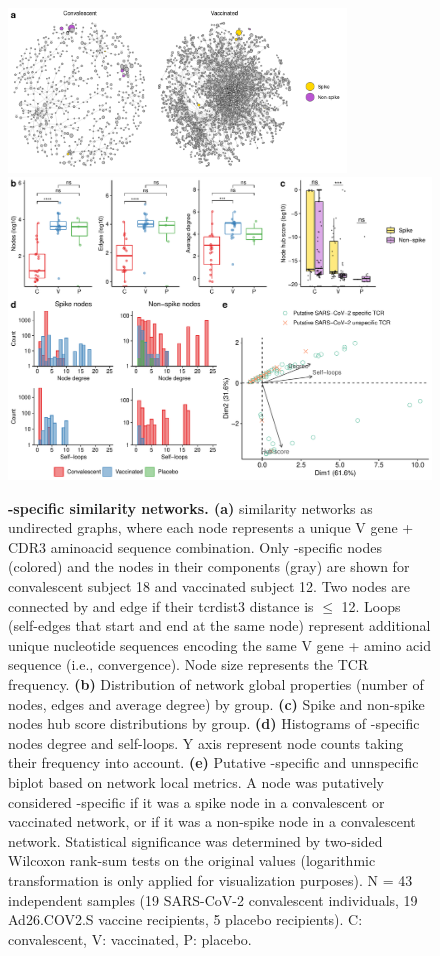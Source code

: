 \begin{figure}[!t]
	\centering
	\includegraphics[width=0.8\textwidth,keepaspectratio]{figures/two_nets.png}
	\includegraphics[width=\textwidth,keepaspectratio]{figures/fig4.pdf}
	\caption{\textbf{\covid-specific \TCRB{} similarity networks. (a)} \TCRB{} similarity networks as undirected graphs, where each node represents a unique V gene + CDR3 aminoacid sequence combination. Only \covid-specific nodes (colored) and the nodes in their components (gray) are shown for convalescent subject 18 and vaccinated subject 12. Two nodes are connected by and edge if their tcrdist3 distance is $\leq$ 12. Loops (self-edges that start and end at the same node) represent additional unique nucleotide sequences encoding the same V gene + amino acid sequence (i.e., convergence). Node size represents the TCR frequency. \textbf{(b)} Distribution of network global properties (number of nodes, edges and average degree) by group. \textbf{(c)} Spike and non-spike nodes hub score distributions by group. \textbf{(d)} Histograms of \covid-specific nodes degree and self-loops. Y axis represent node counts taking their frequency into account. \textbf{(e)} Putative \covid-specific and unnspecific biplot based on network local metrics. A node was putatively considered \covid-specific if it was a spike node in a convalescent or vaccinated network, or if it was a non-spike node in a convalescent network. Statistical significance was determined by two-sided Wilcoxon rank-sum tests on the original values (logarithmic transformation is only applied for visualization purposes). N = 43 independent samples (19 SARS-CoV-2 convalescent individuals, 19 Ad26.COV2.S vaccine recipients, 5 placebo recipients). C: convalescent, V: vaccinated, P: placebo.}
	\label{fig:nets}
\end{figure}



